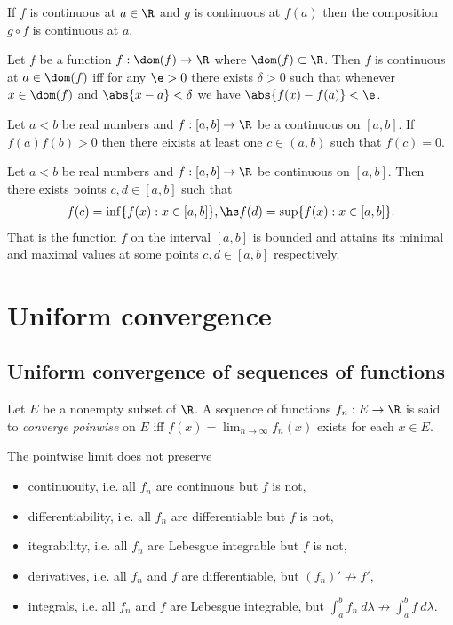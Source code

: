 \documentclass{article}
\begin{document}
\begin{theorem}[Notes 1.11]
	If $f$ is continuous at $a\in\R$ and $g$ is continuous at $f(a)$ then the composition
	$g\circ f$ is continuous at $a$.
\end{theorem}

\begin{theorem}[Notes 1.12]
	Let $f$ be a function $f:\dom(f)\to\R$ where $\dom(f)\subset\R$. Then $f$ is continuous
	at $a\in\dom(f)$ iff for any $\e>0$ there exists $\delta>0$ such that
	whenever $x\in\dom(f)$ and $\abs{x-a}<\delta$ we have $\abs{f(x)-f(a)}<\e$.
\end{theorem}

\begin{theorem}
	Let $a<b$ be real numbers and $f:[a,b]\to\R$ be a continuous on $[a,b]$.
	If $f(a)f(b)>0$ then there eixists at least one $c\in(a,b)$ such that $f(c)=0$.
\end{theorem}

\begin{theorem}
	Let $a<b$ be real numbers and $f:[a,b]\to\R$ be continuous on $[a,b]$. Then
	there exists points $c,d\in[a,b]$ such that
	\begin{align*}
		f(c) = \inf\{f(x):x\in[a,b]\},\hs f(d)=\sup\{f(x):x\in[a,b]\}.
	\end{align*}
	That is the function $f$ on the interval $[a,b]$ is bounded and attains its minimal
	and maximal values at some points $c,d\in[a,b]$ respectively.
\end{theorem}

\section{Uniform convergence}

\subsection{Uniform convergence of sequences of functions}

\begin{definition}
	Let $E$ be a nonempty subset of $\R$. A sequence of functions $f_n:E\to\R$ is said to
	\emph{converge poinwise} on $E$ iff $f(x)=\lim_{n\to\infty}f_n(x)$ exists
	for each $x\in E$.
\end{definition}

\begin{theorem}
	The pointwise limit does not preserve
	\begin{itemize}
		\item continuouity, i.e. all $f_n$ are continuous but $f$ is not,
		\item differentiability, i.e. all $f_n$ are differentiable but $f$ is not,
		\item itegrability, i.e. all $f_n$ are Lebesgue integrable but $f$ is not,
		\item derivatives, i.e. all $f_n$ and $f$ are differentiable, but $(f_n)'\not\to f'$,
		\item integrals, i.e. all $f_n$ and $f$ are Lebesgue integrable, but $\int_a^b f_n\:d\lambda\not\to \int_a^b f\:d\lambda$.
	\end{itemize}
\end{theorem}
\end{document}
